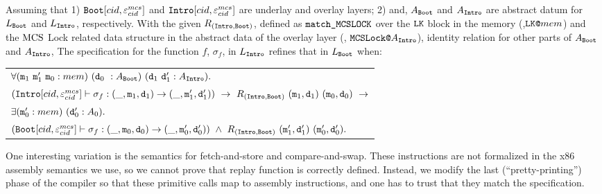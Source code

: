  \begin{theorem}
 \label{thm:chapter:mcslock:machine-state-refinement-full} 
Assuming that 
 1) ${{\mathrm{\texttt{Boot}}}}[cid, {\varepsilon}^{mcs}_{cid}]$ and ${{\mathrm{\texttt{Intro}}}}[cid, {\varepsilon}^{mcs}_{cid}]$ are underlay and overlay layers;
2) and, $A_{{\mathrm{\texttt{Boot}}}}$ and $A_{{\mathrm{\texttt{Intro}}}}$ are abstract datum for $L_{{\mathrm{\texttt{Boot}}}}$ and $L_{{\mathrm{\texttt{Intro}}}}$, respectively.
    With the given $R_{({\mathrm{\texttt{Intro}}}, {\mathrm{\texttt{Boot}}})}$, defined as ${\mathrm{\texttt{match\_MCSLOCK}}}$
     over the ${\mathrm{\texttt{LK}}}$ block in the memory  (\ie,${\mathrm{\texttt{LK}}}{\mathrm{\texttt{@}}}mem$) and 
the $\mathrm{MCS}$ Lock related data structure in the abstract data of the overlay layer (\ie, ${\mathrm{\texttt{MCSLock}}}{\mathrm{\texttt{@}}}A_{{\mathrm{\texttt{Intro}}}}$), 
 identity relation for other parts of $A_{{\mathrm{\texttt{Boot}}}}$ and $A_{{\mathrm{\texttt{Intro}}}}$, 
 The specification for the function $f$, $\sigma_f$, in $L_{{\mathrm{\texttt{Intro}}}}$ refines that in $L_{{\mathrm{\texttt{Boot}}}}$ when:
 \begin{center}
 \begin{tabular}{P{0.95\textwidth}}
$ \forall (\codeinmath{{m}}_{1} \ \codeinmath{{m}}_{1}'\ \codeinmath{{m}}_{0} : mem)\  (\codeinmath{{d}}_{0} \ : A_{\mmcsboot})\ (\codeinmath{{d}}_{1} \ \codeinmath{{d}}_{1}' : A_{\mmcslockintro}). $ \\
 $ (\mmcslockintro[cid, \oracle^{mcs}_{cid}] \vdash \sigma_f : (\_, \codeinmath{m}_1, \codeinmath{d}_1) \rightarrow (\_, \codeinmath{m}_1', \codeinmath{d}_1'))  \ \rightarrow \
  R_{(\mmcslockintro, \mmcsboot)}\ (\codeinmath{{m}}_1, \codeinmath{{d}}_1)\ (\codeinmath{{m}}_0, \codeinmath{{d}}_0) \ \rightarrow $\\
  $ \exists ({\mathrm{\texttt{{m}}}}_{0}' : mem)\ ({\mathrm{\texttt{{d}}}}_{0}' : A_0).$ \\
$({{\mathrm{\texttt{Boot}}}}[cid, {\varepsilon}^{mcs}_{cid}]  \vdash \sigma_f : (\_, {\mathrm{\texttt{m}}}_0, {\mathrm{\texttt{d}}}_0) \rightarrow (\_, {\mathrm{\texttt{m}}}_0', {\mathrm{\texttt{d}}}_0')) \ \wedge \
  R_{({\mathrm{\texttt{Intro}}}, {\mathrm{\texttt{Boot}}})}\ ({\mathrm{\texttt{{m}}}}'_1, {\mathrm{\texttt{{d}}}}'_1)\ ({\mathrm{\texttt{{m}}}}'_0, {\mathrm{\texttt{{d}}}}'_0).$  \\
 \end{tabular}
 \end{center}
 \end{theorem}



One interesting variation is the semantics
for fetch-and-store and compare-and-swap. These instructions are not
formalized in the x86 assembly semantics we use, so we cannot prove
that replay function is correctly defined. Instead, we modify the last
(``pretty-printing'') phase of the compiler so that these primitive calls map to assembly
instructions, and one has to trust that they match the specification.


